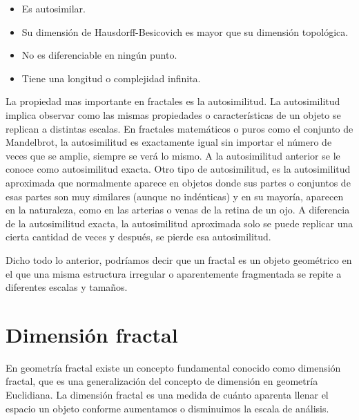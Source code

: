 \begin{itemize}
	\item Es autosimilar.
	\item Su dimensión de Hausdorff-Besicovich es mayor que su dimensión topológica.
	\item No es diferenciable en ningún punto.
	\item Tiene una longitud o complejidad infinita.
\end{itemize}

\clearpage

La  propiedad mas importante en fractales es la autosimilitud. La autosimilitud implica observar como las mismas propiedades o caracter\'{i}sticas de un objeto se replican a distintas escalas. En fractales matem\'{a}ticos o puros como el conjunto de Mandelbrot, la autosimilitud es exactamente igual sin importar el n\'{u}mero de veces que se amplie, siempre se ver\'{a} lo mismo. A la autosimilitud anterior se le conoce como autosimilitud exacta. Otro tipo de autosimilitud, es la autosimilitud aproximada que normalmente aparece en objetos donde sus partes o conjuntos de esas partes son muy similares (aunque no ind\'{e}nticas) y en su mayor\'{i}a, aparecen en la naturaleza, como en las arterias o venas de la retina de un ojo. A diferencia de la autosimilitud exacta, la autosimilitud aproximada solo se puede replicar una cierta cantidad de veces y despu\'{e}s, se pierde esa autosimilitud.

Dicho todo lo anterior, podríamos decir que un fractal es un objeto geométrico en el que una misma estructura irregular o aparentemente fragmentada se repite a diferentes escalas y tamaños. 

\section{Dimensi\'{o}n fractal}

En geometr\'{i}a fractal existe un concepto fundamental conocido como dimensi\'{o}n fractal, que es una generalizaci\'{o}n del concepto de dimensi\'{o}n en geometr\'{i}a Euclidiana. La dimensi\'{o}n fractal es una medida de cu\'{a}nto aparenta llenar el espacio un objeto conforme aumentamos o disminuimos la escala de an\'{a}lisis.



